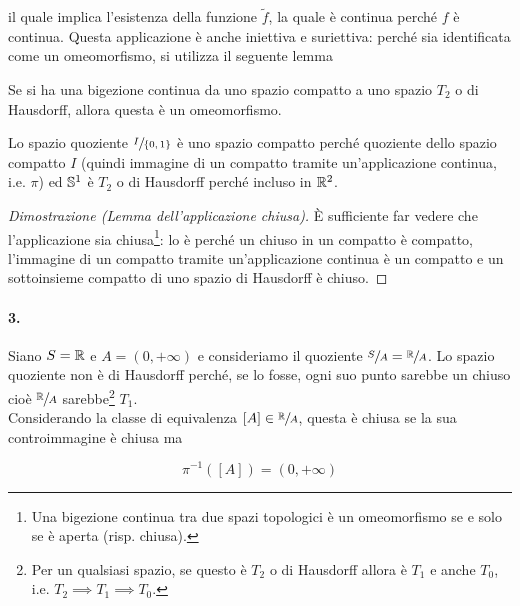 
il quale implica l'esistenza della funzione $ \tilde{f} $, la quale è continua perché $ f $ è continua. Questa applicazione è anche iniettiva e suriettiva: perché sia identificata come un omeomorfismo, si utilizza il seguente lemma

\begin{lemma}\label{lemma-clos-app}
	Se si ha una bigezione continua da uno spazio compatto a uno spazio $ T_{2} $ o di Hausdorff, allora questa è un omeomorfismo.
\end{lemma}

Lo spazio quoziente $ \sfrac{I}{\{0,1\}} $ è uno spazio compatto perché quoziente dello spazio compatto $ I $ (quindi immagine di un compatto tramite un'applicazione continua, i.e. $ \pi $) ed $ \S^{1} $ è $ T_{2} $ o di Hausdorff perché incluso in $ \R^{2} $.

\begin{proof}[Dimostrazione (Lemma dell'applicazione chiusa)]
	\`{E} sufficiente far vedere che l'applicazione sia chiusa\footnote{%
		Una bigezione continua tra due spazi topologici è un omeomorfismo se e solo se è aperta (risp. chiusa).%
	}: lo è perché un chiuso in un compatto è compatto, l'immagine di un compatto tramite un'applicazione continua è un compatto e un sottoinsieme compatto di uno spazio di Hausdorff è chiuso.
\end{proof}

\paragraph{3.}

Siano $ S = \R $ e $ A = (0,+\infty) $ e consideriamo il quoziente $ \sfrac{S}{A} = \sfrac{\R}{A} $. Lo spazio quoziente non è di Hausdorff perché, se lo fosse, ogni suo punto sarebbe un chiuso cioè $ \sfrac{\R}{A} $ sarebbe\footnote{%
	Per un qualsiasi spazio, se questo è $ T_{2} $ o di Hausdorff allora è $ T_{1} $ e anche $ T_{0} $, i.e. $ T_{2} \implies T_{1} \implies T_{0} $.%
} $ T_{1} $.\\
Considerando la classe di equivalenza $ [A] \in \sfrac{\R}{A} $, questa è chiusa se la sua controimmagine è chiusa ma

\begin{equation}
	\pi^{-1} ([A]) = (0,+\infty)
\end{equation}

